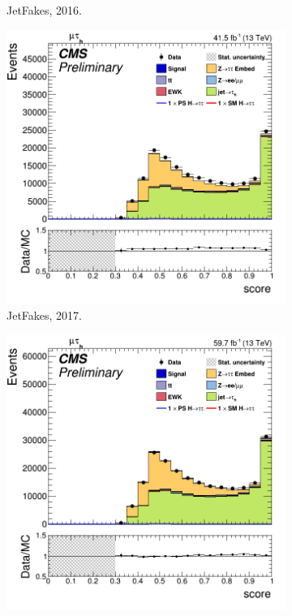 \begin{figure}[!ht]
\begin{subfigure}[b]{0.33\linewidth}
    \caption{JetFakes, 2016.} 
    \vspace{0.5cm}
  \end{subfigure}%
  \begin{subfigure}[b]{0.33\linewidth}
    \centering
    \includegraphics[width=\linewidth]{Chapitre7/Images/CtrlPlots/2017/BDTscoreJetFakes.png} 
    \caption{JetFakes, 2017.} 
    \vspace{0.5cm}
  \end{subfigure} 
    \begin{subfigure}[b]{0.33\linewidth}
    \centering
    \includegraphics[width=\linewidth]{Chapitre7/Images/CtrlPlots/2018/BDTscoreJetFakes.png} 

\end{subfigure}
\end{figure}
